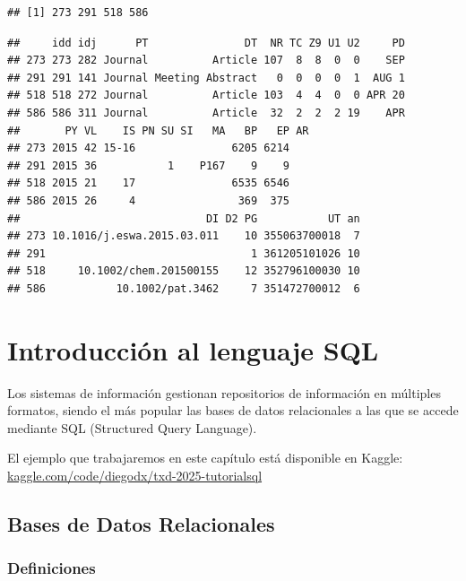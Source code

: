 \documentclass[
]{book}
\newenvironment{Shaded}{\begin{snugshade}}{\end{snugshade}}
\newcommand{\CommentTok}[1]{\textcolor[rgb]{0.56,0.35,0.01}{\textit{#1}}}
\newcommand{\DecValTok}[1]{\textcolor[rgb]{0.00,0.00,0.81}{#1}}
\newcommand{\FunctionTok}[1]{\textcolor[rgb]{0.13,0.29,0.53}{\textbf{#1}}}
\newcommand{\NormalTok}[1]{#1}
\newcommand{\SpecialCharTok}[1]{\textcolor[rgb]{0.81,0.36,0.00}{\textbf{#1}}}
\begin{document}
\begin{verbatim}
## [1] 273 291 518 586
\end{verbatim}

\begin{Shaded}
\end{Shaded}

\begin{verbatim}
##     idd idj      PT               DT  NR TC Z9 U1 U2     PD
## 273 273 282 Journal          Article 107  8  8  0  0    SEP
## 291 291 141 Journal Meeting Abstract   0  0  0  0  1  AUG 1
## 518 518 272 Journal          Article 103  4  4  0  0 APR 20
## 586 586 311 Journal          Article  32  2  2  2 19    APR
##       PY VL    IS PN SU SI   MA   BP   EP AR
## 273 2015 42 15-16               6205 6214   
## 291 2015 36           1    P167    9    9   
## 518 2015 21    17               6535 6546   
## 586 2015 26     4                369  375   
##                             DI D2 PG           UT an
## 273 10.1016/j.eswa.2015.03.011    10 355063700018  7
## 291                                1 361205101026 10
## 518     10.1002/chem.201500155    12 352796100030 10
## 586           10.1002/pat.3462     7 351472700012  6
\end{verbatim}

\chapter{Introducción al lenguaje SQL}\label{introSQL}

Los sistemas de información gestionan repositorios de información en múltiples formatos,
siendo el más popular las bases de datos relacionales a las que se accede mediante SQL (Structured Query Language).

El ejemplo que trabajaremos en este capítulo está disponible en Kaggle: \href{https://www.kaggle.com/code/diegodx/txd-2025-tutorialsql}{kaggle.com/code/diegodx/txd-2025-tutorialsql}

\section{Bases de Datos Relacionales}\label{bases-de-datos-relacionales}

\subsection{Definiciones}\label{definiciones}
\end{document}
